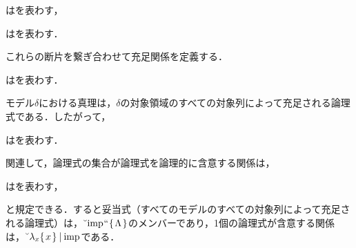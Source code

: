 \begin{df}
\label{df:真理関数の充足関係}
はを表わす，
\end{df}

\begin{df}
\label{df:普遍量化の充足関係}
はを表わす．
\end{df}

\noindent これらの断片を繋ぎ合わせて充足関係を定義する．

\begin{df}
\label{df:充足関係}
はを表わす．
\end{df}

\noindent モデル$\delta$における真理は，$\delta$の対象領域のすべての対象列によって充足される論理式である．したがって，

\begin{df}
\label{df:真理集合}
はを表わす．
\end{df}

\noindent 関連して，論理式の集合が論理式を論理的に含意する関係は，
\begin{df}
\label{df:論理的含意関係}
はを表わす，
\end{df}
\noindent と規定できる．すると妥当式（すべてのモデルのすべての対象列によって充足される論理式）は，$ \breve{\:\:}\mathrm{imp}{\mspace{1mu}{``}\mspace{1mu}}\{\mspace{2mu}\Lambda\mspace{2mu}\} $のメンバーであり，1個の論理式が含意する関係は，$ \breve{\:\:}\lambda_x\{\mspace{2mu}x\mspace{2mu}\}\mathbin{\mid}\mathrm{imp} $である．

